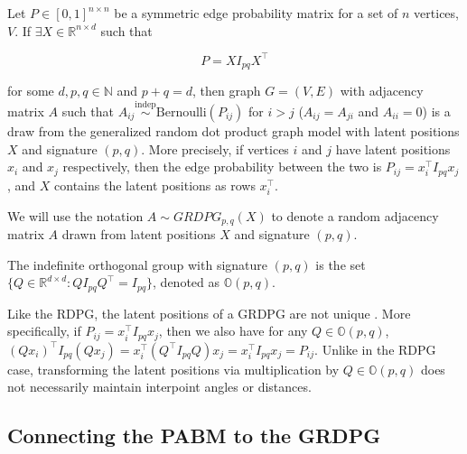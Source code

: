 \documentclass[
  12pt,
]{article}
\begin{document}
\begin{definition} 
\label{grdpg} 
Let $P \in [0, 1]^{n \times n}$ be a symmetric edge probability matrix for a 
set of $n$ vertices, $V$. If $\exists X \in \mathbb{R}^{n \times d}$ such that 

\begin{equation} \label{eq:grdpg}
  P = X I_{pq} X^\top
\end{equation}

for some $d, p, q \in \mathbb{N}$ and $p + q = d$, then 
graph $G = (V, E)$ with adjacency matrix $A$ such that 
$A_{ij} \stackrel{\text{indep}}{\sim}\text{Bernoulli}(P_{ij})$ for $i > j$ ($A_{ij} = A_{ji}$ and 
$A_{ii} = 0$) is a draw from the generalized random dot product graph model 
with latent positions $X$ and signature $(p, q)$. More precisely, if vertices 
$i$ and $j$ have latent positions $x_i$ and $x_j$ respectively, then the edge 
probability between the two is $P_{ij} = x_i^\top I_{pq} x_j$, and $X$ contains 
the latent positions as rows $x_i^\top$. 
\end{definition}

We will use the notation \(A \sim GRDPG_{p,q}(X)\) to denote a random
adjacency matrix \(A\) drawn from latent positions \(X\) and signature
\((p, q)\).

\begin{definition} 
The indefinite orthogonal group with signature $(p, q)$ is 
the set $\{Q \in \mathbb{R}^{d \times d} : Q I_{pq} Q^{\top} = I_{pq}\}$, 
denoted as $\mathbb{O}(p, q)$.
\end{definition}

\begin{remark}
Like the RDPG, the latent positions of a GRDPG are not unique 
\cite{rubindelanchy2017statistical}. 
More specifically, if $P_{ij} = x_i^\top I_{pq} x_j$, then we also have for any 
$Q \in \mathbb{O}(p, q)$, 
$(Q x_i)^\top I_{pq} (Q x_j) = x_i^\top (Q^\top I_{pq} Q) x_j = 
x_i^\top I_{pq} x_j = P_{ij}$. 
Unlike in the RDPG case, transforming the latent positions via multiplication 
by $Q \in \mathbb{O}(p, q)$ does not necessarily maintain interpoint angles or 
distances. 
\end{remark}

\hypertarget{connecting-the-pabm-to-the-grdpg}{%
\subsection{Connecting the PABM to the
GRDPG}\label{connecting-the-pabm-to-the-grdpg}}
\end{document}
